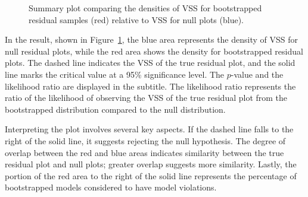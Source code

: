 \documentclass[
doublespace,
  times]{anzsauth}
\newenvironment{Shaded}{\begin{snugshade}}{\end{snugshade}}
\newcommand{\FunctionTok}[1]{\textcolor[rgb]{0.28,0.35,0.67}{#1}}
\newcommand{\NormalTok}[1]{\textcolor[rgb]{0.00,0.23,0.31}{#1}}
\newcommand{\SpecialCharTok}[1]{\textcolor[rgb]{0.37,0.37,0.37}{#1}}
\begin{document}
\begin{Shaded}
\end{Shaded}

\begin{figure}[H]


\caption{\label{fig-summary-plot}Summary plot comparing the densities of
VSS for bootstrapped residual samples (red) relative to VSS for null
plots (blue).}

\end{figure}%

In the result, shown in Figure~\ref{fig-summary-plot}, the blue area
represents the density of VSS for null residual plots, while the red
area shows the density for bootstrapped residual plots. The dashed line
indicates the VSS of the true residual plot, and the solid line marks
the critical value at a 95\% significance level. The \(p\)-value and the
likelihood ratio are displayed in the subtitle. The likelihood ratio
represents the ratio of the likelihood of observing the VSS of the true
residual plot from the bootstrapped distribution compared to the null
distribution.

Interpreting the plot involves several key aspects. If the dashed line
falls to the right of the solid line, it suggests rejecting the null
hypothesis. The degree of overlap between the red and blue areas
indicates similarity between the true residual plot and null plots;
greater overlap suggests more similarity. Lastly, the portion of the red
area to the right of the solid line represents the percentage of
bootstrapped models considered to have model violations.
\end{document}
